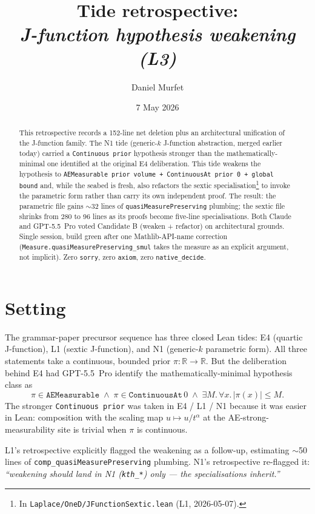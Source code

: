 \documentclass[11pt]{article}
\title{Tide retrospective:\\\emph{J-function hypothesis weakening (L3)}}
\author{Daniel Murfet}
\date{7 May 2026}
\begin{document}
\maketitle

\begin{abstract}
This retrospective records a 152-line net deletion plus an
architectural unification of the J-function family. The N1 tide
(generic-$k$ J-function abstraction, merged earlier today) carried a
\texttt{Continuous prior} hypothesis stronger than the
mathematically-minimal one identified at the original E4
deliberation. This tide weakens the hypothesis to
\texttt{AEMeasurable prior volume + ContinuousAt prior 0 + global
bound} and, while the seabed is fresh, also refactors the sextic
specialisation\footnote{In \texttt{Laplace/OneD/JFunctionSextic.lean}
(L1, 2026-05-07).} to invoke the parametric form rather than carry
its own independent proof. The result: the parametric file gains
$\sim$32 lines of \texttt{quasiMeasurePreserving} plumbing; the
sextic file shrinks from 280 to 96 lines as its proofs become
five-line specialisations. Both Claude and GPT-5.5~Pro voted
Candidate B (weaken + refactor) on architectural grounds. Single
session, build green after one Mathlib-API-name correction
(\texttt{Measure.quasiMeasurePreserving\_smul} takes the measure as
an explicit argument, not implicit). Zero \texttt{sorry}, zero
\texttt{axiom}, zero \texttt{native\_decide}.
\end{abstract}

\section{Setting}

The grammar-paper precursor sequence has three closed Lean tides:
E4 (quartic J-function), L1 (sextic J-function), and N1 (generic-$k$
parametric form). All three statements take a continuous, bounded
prior $\pi : \mathbb R \to \mathbb R$. But the deliberation behind
E4 had GPT-5.5~Pro identify the mathematically-minimal hypothesis
class as
$$
  \pi \in \texttt{AEMeasurable} \;\wedge\;
  \pi \in \texttt{ContinuousAt}\,0 \;\wedge\;
  \exists M.\, \forall x.\, |\pi(x)| \le M.
$$
The stronger \texttt{Continuous prior} was taken in E4 / L1 / N1
because it was easier in Lean: composition with the scaling map
$u \mapsto u/t^\alpha$ at the AE-strong-measurability site is
trivial when $\pi$ is continuous.

L1's retrospective explicitly flagged the weakening as a follow-up,
estimating $\sim$50 lines of \texttt{comp\_quasiMeasurePreserving}
plumbing. N1's retrospective re-flagged it: \emph{``weakening should
land in N1 (\texttt{kth\_*}) only --- the specialisations inherit.''}
\end{document}
